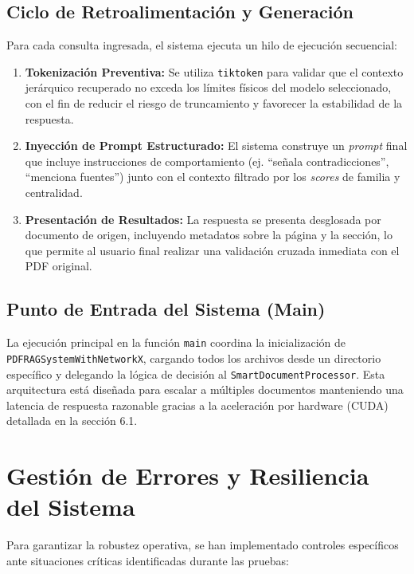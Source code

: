 \subsection{Ciclo de Retroalimentación y Generación}
Para cada consulta ingresada, el sistema ejecuta un hilo de ejecución secuencial:
\begin{enumerate}
    \item \textbf{Tokenización Preventiva:} Se utiliza \texttt{tiktoken} para validar que el contexto jerárquico recuperado no exceda los límites físicos del modelo seleccionado, con el fin de reducir el riesgo de truncamiento y favorecer la estabilidad de la respuesta.
    \item \textbf{Inyección de Prompt Estructurado:} El sistema construye un \textit{prompt} final que incluye instrucciones de comportamiento (ej. ``señala contradicciones'', ``menciona fuentes'') junto con el contexto filtrado por los \textit{scores} de familia y centralidad.
    \item \textbf{Presentación de Resultados:} La respuesta se presenta desglosada por documento de origen, incluyendo metadatos sobre la página y la sección, lo que permite al usuario final realizar una validación cruzada inmediata con el PDF original.
\end{enumerate}

\subsection{Punto de Entrada del Sistema (Main)}
La ejecución principal en la función \texttt{main} coordina la inicialización de \texttt{PDFRAG\-System\-With\-NetworkX}, cargando todos los archivos desde un directorio específico y delegando la lógica de decisión al \texttt{Smart\-Document\-Processor}. Esta arquitectura está diseñada para escalar a múltiples documentos manteniendo una latencia de respuesta razonable gracias a la aceleración por hardware (CUDA) detallada en la sección 6.1.

\newpage
\section{Gestión de Errores y Resiliencia del Sistema}
Para garantizar la robustez operativa, se han implementado controles específicos ante situaciones críticas identificadas durante las pruebas:

